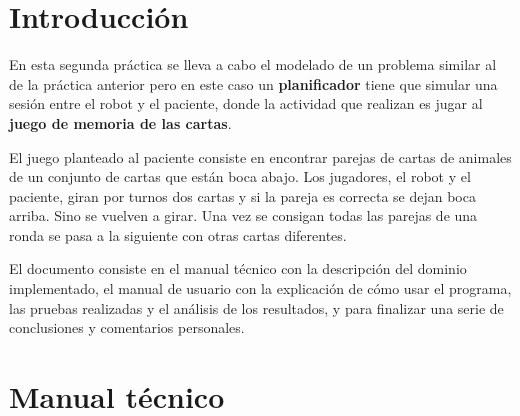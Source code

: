 \documentclass{uc3mpracticas}
\begin{document}
  \frontmatter



  \vspace{55mm}


  \newpage

  \tableofcontents

  \newpage

  \mainmatter

  \section{Introducción}

  En esta segunda práctica se lleva a cabo el modelado de un problema similar al de la práctica anterior pero en este caso un \textbf{planificador} tiene que simular una sesión entre el robot y el paciente, donde la actividad que realizan es jugar al \textbf{juego de memoria de las cartas}.

  \vspace{2mm}

  El juego planteado al paciente consiste en encontrar parejas de cartas de animales de un conjunto de cartas que están boca abajo. Los jugadores, el robot y el paciente, giran por turnos dos cartas y si la pareja es correcta se dejan boca arriba. Sino se vuelven a girar. Una vez se consigan todas las parejas de una ronda se pasa a la siguiente con otras cartas diferentes.

  \vspace{3mm}

  El documento consiste en el manual técnico con la descripción del dominio implementado, el manual de usuario con la explicación de cómo usar el programa, las pruebas realizadas y el análisis de los resultados, y para finalizar una serie de conclusiones y comentarios personales.

  \vspace{5mm}

  \section{Manual técnico}
\end{document}
